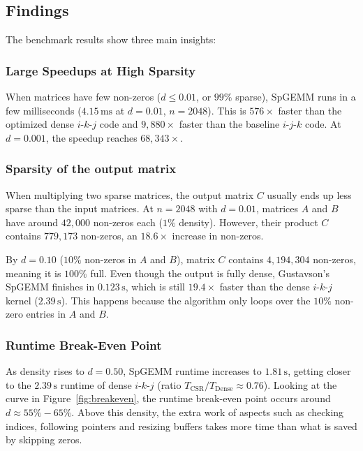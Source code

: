 \documentclass[10pt,conference,a4paper]{IEEEtran}
\begin{document}
\subsection{Findings}
The benchmark results show three main insights:

\subsubsection{Large Speedups at High Sparsity}
When matrices have few non-zeros ($d \le 0.01$, or $99\%$ sparse), SpGEMM runs in a few milliseconds ($4.15\,\text{ms}$ at $d=0.01$, $n=2048$). 
This is $576\times$ faster than the optimized dense $i\text{-}k\text{-}j$ code and $9{,}880\times$ faster than the baseline $i\text{-}j\text{-}k$ code. 
At $d=0.001$, the speedup reaches $68{,}343\times$.

\subsubsection{Sparsity of the output matrix}
When multiplying two sparse matrices, the output matrix $C$ usually ends up less sparse than the input matrices. 
At $n=2048$ with $d=0.01$, matrices $A$ and $B$ have around $42{,}000$ non-zeros each ($1\%$ density). 
However, their product $C$ contains $779{,}173$ non-zeros, an $18.6\times$ increase in non-zeros.

By $d=0.10$ ($10\%$ non-zeros in $A$ and $B$), matrix $C$ contains $4{,}194,304$ non-zeros, meaning it is $100\%$ full. 
Even though the output is fully dense, Gustavson's SpGEMM finishes in $0.123\,\text{s}$, which is still $19.4\times$ faster than the dense $i\text{-}k\text{-}j$ kernel ($2.39\,\text{s}$). 
This happens because the algorithm only loops over the $10\%$ non-zero entries in $A$ and $B$.

\subsubsection{Runtime Break-Even Point}
As density rises to $d=0.50$, SpGEMM runtime increases to $1.81\,\text{s}$, getting closer to the $2.39\,\text{s}$ runtime of dense $i\text{-}k\text{-}j$ (ratio $T_{\text{CSR}} / T_{\text{Dense}} \approx 0.76$). 
Looking at the curve in Figure~\ref{fig:breakeven}, the runtime break-even point occurs around $d \approx 55\% - 65\%$. 
Above this density, the extra work of aspects such as checking indices, following pointers and resizing buffers takes more time than what is saved by skipping zeros.
\end{document}

